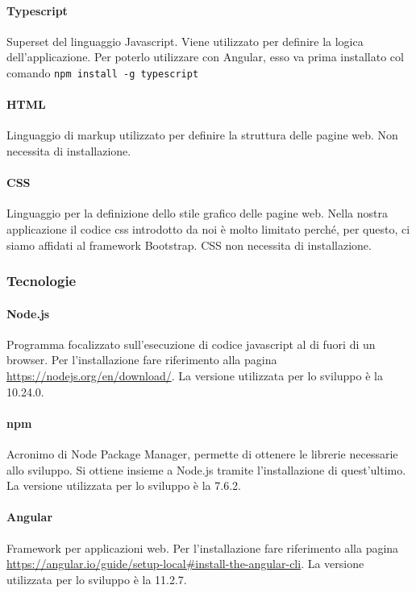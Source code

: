 \paragraph{Typescript}
Superset del linguaggio Javascript. Viene utilizzato per definire la logica dell'applicazione. \newline
Per poterlo utilizzare con Angular, esso va prima installato col comando \newline
	\texttt{npm install -g typescript}

\paragraph{HTML}
Linguaggio di markup utilizzato per definire la struttura delle pagine web. Non necessita di installazione.

\paragraph{CSS}
Linguaggio per la definizione dello stile grafico delle pagine web. Nella nostra applicazione il codice css introdotto da noi è molto limitato perché, per questo, ci siamo affidati al framework Bootstrap. CSS non necessita di installazione.

\subsubsection{Tecnologie}
\paragraph{Node.js}
Programma focalizzato sull'esecuzione di codice javascript al di fuori di un browser.
Per l'installazione fare riferimento alla pagina \url{https://nodejs.org/en/download/}. La versione utilizzata per lo sviluppo è la 10.24.0.
\paragraph{npm}
Acronimo di Node Package Manager, permette di ottenere le librerie necessarie allo sviluppo.
Si ottiene insieme a Node.js tramite l'installazione di quest'ultimo. La versione utilizzata per lo sviluppo è la 7.6.2.
\paragraph{Angular}
Framework per applicazioni web.
Per l'installazione fare riferimento alla pagina \url{https://angular.io/guide/setup-local#install-the-angular-cli}. La versione utilizzata per lo sviluppo è la 11.2.7.
